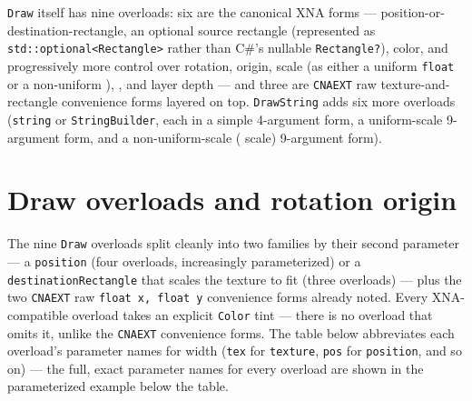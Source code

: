 \texttt{Draw} itself has nine overloads: six are the canonical XNA forms ---
position-or-destination-rectangle, an optional source rectangle (represented as
\texttt{std::optional<Rectangle>} rather than C\#'s nullable \texttt{Rectangle?}), color, and
progressively more control over rotation, origin, scale (as either a uniform \texttt{float} or
a non-uniform ), , and layer depth --- and three are
\texttt{CNAEXT} raw texture-and-rectangle convenience forms layered on top.
\texttt{DrawString} adds six more overloads (\texttt{string} or \texttt{StringBuilder}, each in
a simple 4-argument form, a uniform-scale 9-argument form, and a non-uniform-scale
( scale) 9-argument form).

\section{Draw overloads and rotation origin}

The nine \texttt{Draw} overloads split cleanly into two families by their second parameter ---
a  \texttt{position} (four overloads, increasingly parameterized) or a
 \texttt{destinationRectangle} that scales the texture to fit (three
overloads) --- plus the two \texttt{CNAEXT} raw \texttt{float x, float y} convenience forms
already noted. Every XNA-compatible overload takes an explicit \texttt{Color} tint
--- there is no overload that omits it, unlike the \texttt{CNAEXT} convenience forms. The table
below abbreviates each overload's parameter names for width (\texttt{tex} for \texttt{texture},
\texttt{pos} for \texttt{position}, and so on) --- the full, exact parameter names for every
overload are shown in the parameterized example below the table.

